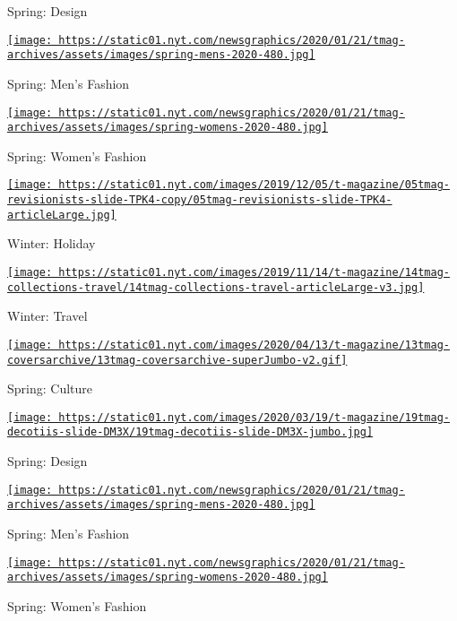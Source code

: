 Spring: Design

\href{https://www.nytimes.com/issue/t-magazine/2020/02/21/ts-march-8-mens-fashion-issue}{\texttt{[image: https://static01.nyt.com/newsgraphics/2020/01/21/tmag-archives/assets/images/spring-mens-2020-480.jpg]}}

Spring: Men's Fashion

\href{https://www.nytimes.com/issue/t-magazine/2020/02/06/ts-feb-23-womens-fashion-issue}{\texttt{[image: https://static01.nyt.com/newsgraphics/2020/01/21/tmag-archives/assets/images/spring-womens-2020-480.jpg]}}

Spring: Women's Fashion

\href{https://www.nytimes.com/issue/t-magazine/2019/11/21/ts-dec-8-holiday-issue}{\texttt{[image: https://static01.nyt.com/images/2019/12/05/t-magazine/05tmag-revisionists-slide-TPK4-copy/05tmag-revisionists-slide-TPK4-articleLarge.jpg]}}

Winter: Holiday

\href{https://www.nytimes.com/issue/t-magazine/2019/11/04/ts-nov-17-travel-issue}{\texttt{[image: https://static01.nyt.com/images/2019/11/14/t-magazine/14tmag-collections-travel/14tmag-collections-travel-articleLarge-v3.jpg]}}

Winter: Travel

\href{https://www.nytimes.com/issue/t-magazine/2020/04/12/ts-april-19-culture-issue}{\texttt{[image: https://static01.nyt.com/images/2020/04/13/t-magazine/13tmag-coversarchive/13tmag-coversarchive-superJumbo-v2.gif]}}

Spring: Culture

\href{https://www.nytimes.com/issue/t-magazine/2020/03/06/ts-march-22-design-issue}{\texttt{[image: https://static01.nyt.com/images/2020/03/19/t-magazine/19tmag-decotiis-slide-DM3X/19tmag-decotiis-slide-DM3X-jumbo.jpg]}}

Spring: Design

\href{https://www.nytimes.com/issue/t-magazine/2020/02/21/ts-march-8-mens-fashion-issue}{\texttt{[image: https://static01.nyt.com/newsgraphics/2020/01/21/tmag-archives/assets/images/spring-mens-2020-480.jpg]}}

Spring: Men's Fashion

\href{https://www.nytimes.com/issue/t-magazine/2020/02/06/ts-feb-23-womens-fashion-issue}{\texttt{[image: https://static01.nyt.com/newsgraphics/2020/01/21/tmag-archives/assets/images/spring-womens-2020-480.jpg]}}

Spring: Women's Fashion

